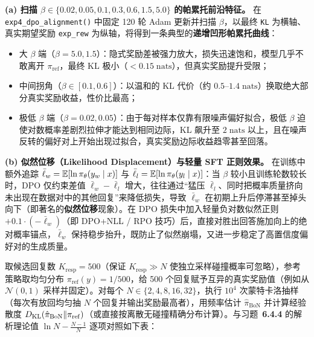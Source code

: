 
\textbf{(a) 扫描 $\beta \in \{0.02, 0.05, 0.1, 0.3, 0.6, 1.5, 5.0\}$ 的帕累托前沿特征。} 在 \texttt{exp4\_dpo\_alignment()} 中固定 120 轮 Adam 更新并扫描 $\beta$，以最终 \texttt{KL} 为横轴、真实期望奖励 \texttt{exp\_rew} 为纵轴，将得到一条典型的\textbf{递增凹形帕累托曲线}：
\begin{itemize}
  \item 大 $\beta$ 端（$\beta = 5.0, 1.5$）：隐式奖励差被强力放大，损失迅速饱和，模型几乎不敢离开 $\pi_{\mathrm{ref}}$，最终 KL 极小（$< 0.15\;\text{nats}$），但真实奖励提升受限；
  \item 中间拐角（$\beta \in [0.1, 0.6]$）：以温和的 KL 代价（约 $0.5\text{--}1.4\;\text{nats}$）换取绝大部分真实奖励收益，性价比最高；
  \item 极低 $\beta$ 端（$\beta = 0.02, 0.05$）：由于每对样本仅靠有限噪声偏好拟合，极低 $\beta$ 迫使对数概率差剧烈拉伸才能达到相同边际，KL 飙升至 $2\;\text{nats}$ 以上，且在噪声反转的偏好对上开始出现过拟合，真实奖励边际收益趋零甚至回落。
\end{itemize}

\textbf{(b) 似然位移（Likelihood Displacement）与轻量 SFT 正则效果。} 在训练中额外追踪 $\bar{\ell}_w = \mathbb{E}[\ln \pi_\theta(y_w \mid x)]$ 与 $\bar{\ell}_l = \mathbb{E}[\ln \pi_\theta(y_l \mid x)]$：当 $\beta$ 较小且训练轮数较长时，DPO 仅约束差值 $\bar{\ell}_w - \bar{\ell}_l$ 增大，往往通过“猛压 $\bar{\ell}_l$、同时把概率质量挤向未出现在数据对中的其他回复”来降低损失，导致 $\bar{\ell}_w$ 在初期上升后停滞甚至掉头向下（即著名的\textbf{似然位移}现象）。在 DPO 损失中加入轻量负对数似然正则 $+0.1 \cdot (-\bar{\ell}_w)$（即 DPO+NLL / RPO 技巧）后，直接对胜出回答施加向上的绝对概率锚点，$\bar{\ell}_w$ 保持稳步抬升，既防止了似然崩塌，又进一步稳定了高置信度偏好对的生成质量。


取候选回复数 $K_{\mathrm{resp}} = 500$（保证 $K_{\mathrm{resp}} \gg N$ 使独立采样碰撞概率可忽略），参考策略取均匀分布 $\pi_{\mathrm{ref}}(y) = 1 / 500$，给 500 个回复赋予互异的真实奖励值（例如从 $\mathcal{N}(0, 1)$ 采样并固定）。对每个 $N \in \{2, 4, 8, 16, 32\}$，执行 $10^4$ 次蒙特卡洛抽样（每次有放回均匀抽 $N$ 个回复并输出奖励最高者），用频率估计 $\hat{\pi}_{\mathrm{BoN}}$ 并计算经验散度 $D_{\mathrm{KL}}(\hat{\pi}_{\mathrm{BoN}} \| \pi_{\mathrm{ref}})$（或直接按离散无碰撞精确分布计算）。与习题~\textbf{6.4.4} 的解析理论值 $\ln N - \frac{N-1}{N}$ 逐项对照如下表：

